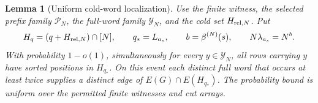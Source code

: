 \documentclass[11pt]{article}
\numberwithin{equation}{section}
\newtheorem{lemma}[theorem]{Lemma}
\theoremstyle{definition}
\theoremstyle{remark}
\newcommand{\1}{\mathbf 1}
\begin{document}
\begin{lemma}[Uniform cold-word localization]
\label{lem:localization}
Use the finite witness, the selected prefix family \(\mathcal P_N\),
the full-word family \(\mathcal Y_N\), and the cold set
\(H_{{\rm rel},N}\).  Put
\[
 H_q=(q+H_{{\rm rel},N})\cap[N],\qquad q_*=L_{a_s},\qquad
 b=\beta^{(N)}(s),\qquad N\lambda_{a_s}=N^b.
\]
With probability \(1-o(1)\), simultaneously for every
\(y\in\mathcal Y_N\), all rows carrying \(y\) have sorted
positions in \(H_{q_*}\).  On this event each distinct full word
that occurs at least twice supplies a distinct edge of
\(E(G)\cap E(H_{q_*})\).  The probability bound is uniform over
the permitted finite witnesses and cut arrays.
\end{lemma}
\end{document}
